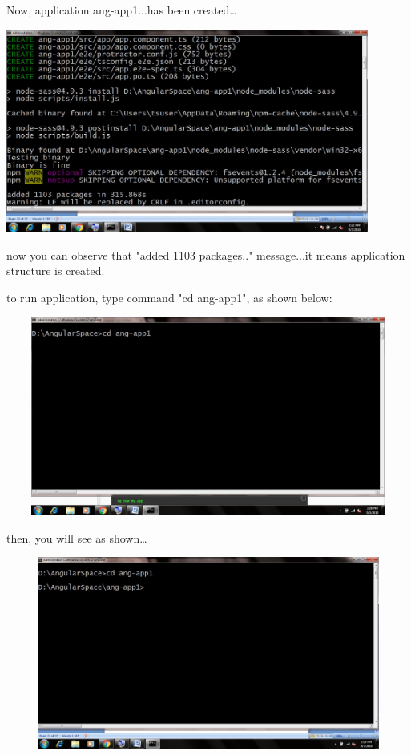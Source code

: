 \documentclass{article}
\begin{document}
\noindent  Now, application ang-app1...has been created{\dots}

\begin{center}
	\noindent \includegraphics*[width=4.70in, height=2.64in]{IMG-01-20}
\end{center}

\noindent now you can observe that "added 1103 packages.." message...it means application structure is created.

\noindent to run application, type command "cd ang-app1", as shown below:

\begin{center}
	\noindent \includegraphics*[width=5.26in, height=2.58in, trim=0.00in 0.38in 0.00in 0.00in]{IMG-01-21}
\end{center}

\noindent then, you will see as shown{\dots}

\begin{center}
	\noindent \includegraphics*[width=5.26in, height=2.49in, trim=0.00in 0.47in 0.00in 0.00in]{IMG-01-22} 
\end{center}
\end{document}
